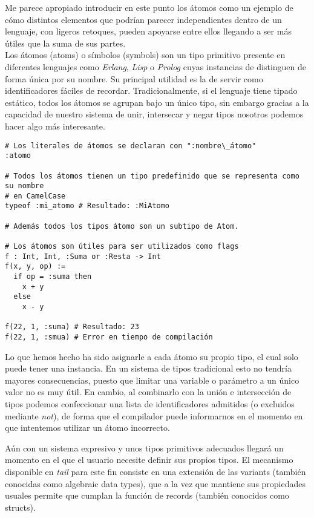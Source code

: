 Me parece apropiado introducir en este punto los átomos como un ejemplo de cómo distintos elementos que podrían parecer independientes dentro de un lenguaje, con ligeros retoques, pueden apoyarse entre ellos llegando a ser más útiles que la suma de sus partes.\\

Los átomos (atoms) o símbolos (symbols) son un tipo primitivo presente en diferentes lenguajes como \textit{Erlang}, \textit{Lisp} o \textit{Prolog} cuyas instancias de distinguen de forma única por su nombre. Su principal utilidad es la de servir como identificadores fáciles de recordar. Tradicionalmente, si el lenguaje tiene tipado estático, todos los átomos se agrupan bajo un único tipo, sin embargo gracias a la capacidad de nuestro sistema de unir, intersecar y negar tipos nosotros podemos hacer algo más interesante.

\begin{lstlisting}[style=tail, caption={Átomos}]
# Los literales de átomos se declaran con ":nombre\_átomo"
:atomo

# Todos los átomos tienen un tipo predefinido que se representa como su nombre
# en CamelCase
typeof :mi_atomo # Resultado: :MiAtomo

# Además todos los tipos átomo son un subtipo de Atom.

# Los átomos son útiles para ser utilizados como flags
f : Int, Int, :Suma or :Resta -> Int
f(x, y, op) :=
  if op = :suma then
    x + y
  else
    x - y
  
f(22, 1, :suma) # Resultado: 23
f(22, 1, :smua) # Error en tiempo de compilación
\end{lstlisting}

Lo que hemos hecho ha sido asignarle a cada átomo su propio tipo, el cual solo puede tener una instancia. En un sistema de tipos tradicional esto no tendría mayores consecuencias, puesto que limitar una variable o parámetro a un único valor no es muy útil. En cambio, al combinarlo con la unión e intersección de tipos podemos confeccionar una lista de identificadores admitidos (o excluidos mediante \textit{not}), de forma que el compilador puede informarnos en el momento en que intentemos utilizar un átomo incorrecto.

Aún con un sistema expresivo y unos tipos primitivos adecuados llegará un momento en el que el usuario necesite definir sus propios tipos. El mecanismo disponible en \textit{tail} para este fin consiste en una extensión de las variants (también conocidas como algebraic data types), que a la vez que mantiene sus propiedades usuales permite que cumplan la función de records (también conocidos como structs).


